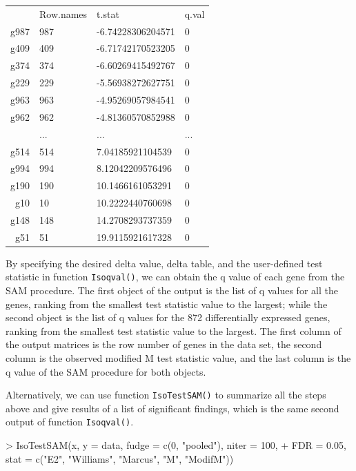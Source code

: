\documentclass[10pt]{mybook4}
\begin{document}
\begin{table}[!h]
\begin{left}
\begin{tabular}{rlll}
  & Row.names & t.stat & q.val \\
 g987 & 987 & -6.74228306204571 & 0 \\
  g409 & 409 & -6.71742170523205 & 0 \\
  g374 & 374 & -6.60269415492767 & 0 \\
  g229 & 229 & -5.56938272627751 & 0 \\
  g963 & 963 & -4.95269057984541 & 0 \\
  g962 & 962 & -4.81360570852988 & 0 \\
   & ... & ... & ... \\
  g514 & 514 & 7.04185921104539 & 0 \\
  g994 & 994 & 8.12042209576496 & 0 \\
  g190 & 190 & 10.1466161053291 & 0 \\
  g10 & 10 & 10.2222440760698 & 0 \\
  g148 & 148 & 14.2708293737359 & 0 \\
  g51 & 51 & 19.9115921617328 & 0 \\
  \end{tabular}
\end{left}
\end{table}
By specifying the desired delta value, delta table, and the user-defined test statistic in function \texttt{Isoqval()}, we can obtain
the q value of each gene from the SAM procedure. The first object of the output is the list of q values for
all the genes, ranking from the smallest test statistic value to the largest; while the second object is the list of q values
for the 872 differentially expressed genes, ranking from the smallest test statistic value to the largest. The first column of the output matrices is the row number of genes in
the data set, the second column is the observed modified M test statistic value, and the last column is the q value of the
SAM procedure for both objects.

Alternatively, we can use function \texttt{IsoTestSAM()} to summarize all the steps above and give results of a list of significant findings, which is the same second output of function \texttt{Isoqval()}.

\begin{Schunk}
\begin{Sinput}
> IsoTestSAM(x, y = data, fudge = c(0, "pooled"), niter = 100, 
+     FDR = 0.05, stat = c("E2", "Williams", "Marcus", "M", "ModifM"))
\end{Sinput}
\end{Schunk}
\end{document}
